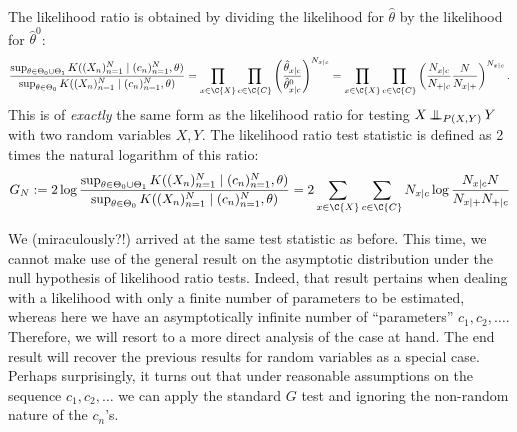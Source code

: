 The likelihood ratio is obtained by dividing the likelihood for $\hat \theta$ by the likelihood for $\hat \theta^0$:
\begin{equation}\label{eq:ext_G_test_statistic}
  \frac{\sup_{\theta\in\Theta_0 \cup \Theta_1} K((X_n)_{n=1}^N \mid (c_n)_{n=1}^N, \theta)}{\sup_{\theta\in\Theta_0} K((X_n)_{n=1}^N \mid (c_n)_{n=1}^N, \theta)}
= \prod_{x\in\C{X}} \prod_{c\in\C{C}} \left(\frac{\hat \theta_{x|c}}{\hat \theta^0_{x|c}}\right)^{N_{x|c}} 
= \prod_{x\in\C{X}} \prod_{c\in\C{C}} \left(\frac{N_{x|c}}{N_{+|c}} \frac{N}{N_{x|+}}\right)^{N_{x|c}}.
\end{equation}
This is of \emph{exactly} the same form as the likelihood ratio  for testing
$X \operatorname*{\perp\mkern-11mu\perp}_{P(X,Y)} Y$ with two random variables $X,Y$.
The likelihood ratio test statistic is defined as 2 times the natural logarithm of this ratio:
$$G_N := 2 \log \frac{\sup_{\theta\in\Theta_0 \cup \Theta_1} K((X_n)_{n=1}^N \mid (c_n)_{n=1}^N, \theta)}{\sup_{\theta\in\Theta_0} K((X_n)_{n=1}^N \mid (c_n)_{n=1}^N, \theta)} = 2 \sum_{x\in\C{X}} \sum_{c\in\C{C}} N_{x|c} \log \frac{N_{x|c} N}{N_{x|+} N_{+|c}}$$

We (miraculously?!) arrived at the same test statistic as before.
This time, we cannot make use of the general result on the asymptotic distribution under the null hypothesis of 
likelihood ratio tests. Indeed, that result pertains when dealing
with a likelihood with only a finite number of parameters to be estimated, whereas here we have an asymptotically infinite number
of ``parameters'' $c_1,c_2,\dots$. Therefore, we will resort to a more direct analysis of the case at hand. The end result will
recover the previous results for random variables as a special case. Perhaps surprisingly, it turns out that under reasonable 
assumptions on the sequence $c_1,c_2,\dots$ we can apply the standard $G$ test and ignoring the non-random nature of the $c_n$'s.

